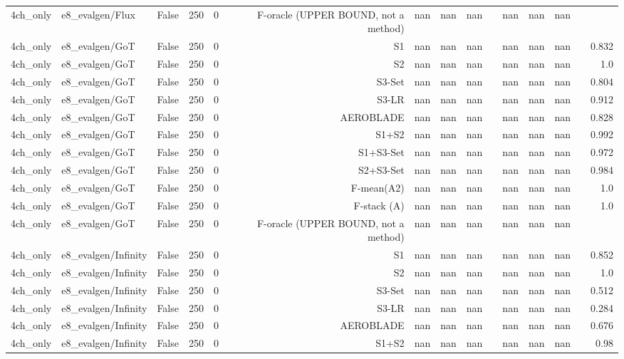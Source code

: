 \begin{table}[htbp]
\begin{tabular}{llrrrrrrrrrrrrr}
4ch\_only & e8\_evalgen/Flux & False & 250 & 0 & F-oracle (UPPER BOUND, not a method) & nan & nan & nan &  & nan & nan & nan &  &  \\
4ch\_only & e8\_evalgen/GoT & False & 250 & 0 & S1 & nan & nan & nan &  & nan & nan & nan &  & 0.832 \\
4ch\_only & e8\_evalgen/GoT & False & 250 & 0 & S2 & nan & nan & nan &  & nan & nan & nan &  & 1.0 \\
4ch\_only & e8\_evalgen/GoT & False & 250 & 0 & S3-Set & nan & nan & nan &  & nan & nan & nan &  & 0.804 \\
4ch\_only & e8\_evalgen/GoT & False & 250 & 0 & S3-LR & nan & nan & nan &  & nan & nan & nan &  & 0.912 \\
4ch\_only & e8\_evalgen/GoT & False & 250 & 0 & AEROBLADE & nan & nan & nan &  & nan & nan & nan &  & 0.828 \\
4ch\_only & e8\_evalgen/GoT & False & 250 & 0 & S1+S2 & nan & nan & nan &  & nan & nan & nan &  & 0.992 \\
4ch\_only & e8\_evalgen/GoT & False & 250 & 0 & S1+S3-Set & nan & nan & nan &  & nan & nan & nan &  & 0.972 \\
4ch\_only & e8\_evalgen/GoT & False & 250 & 0 & S2+S3-Set & nan & nan & nan &  & nan & nan & nan &  & 0.984 \\
4ch\_only & e8\_evalgen/GoT & False & 250 & 0 & F-mean(A2) & nan & nan & nan &  & nan & nan & nan &  & 1.0 \\
4ch\_only & e8\_evalgen/GoT & False & 250 & 0 & F-stack (A) & nan & nan & nan &  & nan & nan & nan &  & 1.0 \\
4ch\_only & e8\_evalgen/GoT & False & 250 & 0 & F-oracle (UPPER BOUND, not a method) & nan & nan & nan &  & nan & nan & nan &  &  \\
4ch\_only & e8\_evalgen/Infinity & False & 250 & 0 & S1 & nan & nan & nan &  & nan & nan & nan &  & 0.852 \\
4ch\_only & e8\_evalgen/Infinity & False & 250 & 0 & S2 & nan & nan & nan &  & nan & nan & nan &  & 1.0 \\
4ch\_only & e8\_evalgen/Infinity & False & 250 & 0 & S3-Set & nan & nan & nan &  & nan & nan & nan &  & 0.512 \\
4ch\_only & e8\_evalgen/Infinity & False & 250 & 0 & S3-LR & nan & nan & nan &  & nan & nan & nan &  & 0.284 \\
4ch\_only & e8\_evalgen/Infinity & False & 250 & 0 & AEROBLADE & nan & nan & nan &  & nan & nan & nan &  & 0.676 \\
4ch\_only & e8\_evalgen/Infinity & False & 250 & 0 & S1+S2 & nan & nan & nan &  & nan & nan & nan &  & 0.98 \\

\end{tabular}
\end{table}
